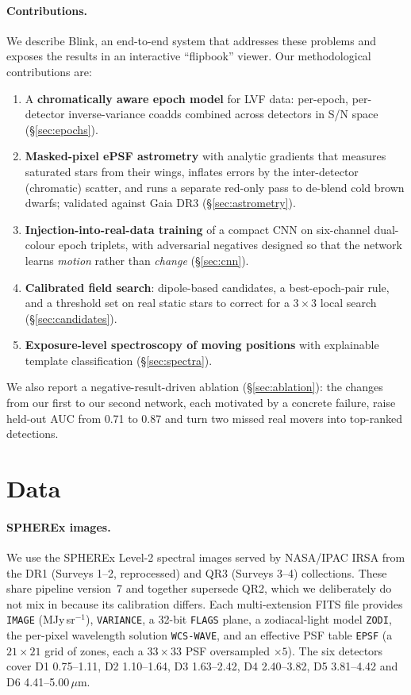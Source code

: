 \documentclass[10pt,twocolumn]{article}
\newcommand{\um}{\ensuremath{\mu\mathrm{m}}}
\newcommand{\SN}{S/N}
\begin{document}
\paragraph{Contributions.} We describe Blink, an end-to-end system that addresses these problems and
exposes the results in an interactive ``flipbook'' viewer. Our methodological contributions are:
\begin{enumerate}
  \item A \textbf{chromatically aware epoch model} for LVF data: per-epoch, per-detector
        inverse-variance coadds combined across detectors in \SN{} space (\S\ref{sec:epochs}).
  \item \textbf{Masked-pixel ePSF astrometry} with analytic gradients that measures saturated stars from
        their wings, inflates errors by the inter-detector (chromatic) scatter, and runs a separate red-only
        pass to de-blend cold brown dwarfs; validated against Gaia DR3 (\S\ref{sec:astrometry}).
  \item \textbf{Injection-into-real-data training} of a compact CNN on six-channel dual-colour
        epoch triplets, with adversarial negatives designed so that the network learns \emph{motion} rather
        than \emph{change} (\S\ref{sec:cnn}).
  \item \textbf{Calibrated field search}: dipole-based candidates, a best-epoch-pair rule, and a threshold
        set on real static stars to correct for a $3\times3$ local search (\S\ref{sec:candidates}).
  \item \textbf{Exposure-level spectroscopy of moving positions} with explainable template classification
        (\S\ref{sec:spectra}).
\end{enumerate}
We also report a negative-result-driven ablation (\S\ref{sec:ablation}): the changes from our first to
our second network, each motivated by a concrete failure, raise held-out AUC from 0.71 to 0.87 and turn
two missed real movers into top-ranked detections.

\section{Data}
\label{sec:data}

\paragraph{SPHEREx images.} We use the SPHEREx Level-2 spectral images served by NASA/IPAC IRSA from
the DR1 (Surveys 1--2, reprocessed) and QR3 (Surveys 3--4) collections. These share pipeline version~7
and together supersede QR2, which we deliberately do not mix in because its calibration differs. Each
multi-extension FITS file provides \texttt{IMAGE} (MJy\,sr$^{-1}$), \texttt{VARIANCE}, a 32-bit
\texttt{FLAGS} plane, a zodiacal-light model \texttt{ZODI}, the per-pixel wavelength solution
\texttt{WCS-WAVE}, and an effective PSF table \texttt{EPSF} (a $21\times21$ grid of zones, each a
$33\times33$ PSF oversampled $\times5$). The six detectors cover D1 0.75--1.11, D2 1.10--1.64,
D3 1.63--2.42, D4 2.40--3.82, D5 3.81--4.42 and D6 4.41--5.00\,\um.
\end{document}
